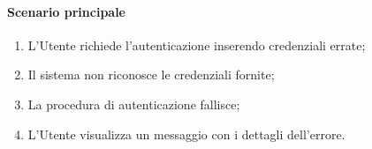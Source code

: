\paragraph*{Scenario principale}
\begin{enumerate}
  \item L'Utente richiede l'autenticazione inserendo credenziali errate; 
  \item Il sistema non riconosce le credenziali fornite;  
  \item La procedura di autenticazione fallisce;
  \item L'Utente visualizza un messaggio con i dettagli dell'errore.
\end{enumerate}